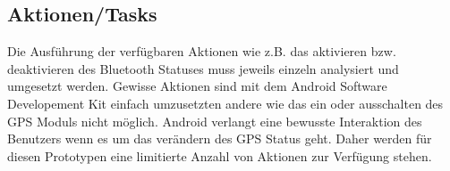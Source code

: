 \subsection{Aktionen/Tasks}
Die Ausführung der verfügbaren Aktionen wie z.B. das aktivieren bzw. deaktivieren des Bluetooth Statuses muss jeweils einzeln analysiert und umgesetzt werden. Gewisse Aktionen sind mit dem Android Software Developement Kit einfach umzusetzten andere wie das ein oder ausschalten des GPS Moduls nicht möglich. Android verlangt eine bewusste Interaktion des Benutzers wenn es um das verändern des GPS Status geht. Daher werden für diesen Prototypen eine limitierte Anzahl von Aktionen zur Verfügung stehen.